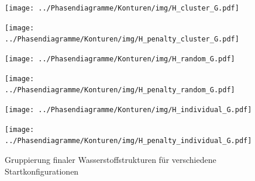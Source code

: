 \documentclass[a4paper, 10pt, twoside, openany]{book} %
\begin{document}
	\begin{figure}
		\begin{minipage}[t]{0.48\textwidth}
			\texttt{[image: ../Phasendiagramme/Konturen/img/H\_cluster\_G.pdf]}
			\label{H_cluster_G}
		\end{minipage}
		\hfill
		\begin{minipage}[t]{0.48\textwidth}
			\texttt{[image: ../Phasendiagramme/Konturen/img/H\_penalty\_cluster\_G.pdf]}
			\label{H_penalty_cluster_G}
		\end{minipage}
		\begin{minipage}[t]{0.48\textwidth}
			\texttt{[image: ../Phasendiagramme/Konturen/img/H\_random\_G.pdf]}
			\label{H_random_G}
		\end{minipage}
		\hfill
		\begin{minipage}[t]{0.48\textwidth}
			\texttt{[image: ../Phasendiagramme/Konturen/img/H\_penalty\_random\_G.pdf]}
			\label{H_penalty_random_G}
		\end{minipage}
		\begin{minipage}[t]{0.48\textwidth}
			\texttt{[image: ../Phasendiagramme/Konturen/img/H\_individual\_G.pdf]}
			\label{H_individual_G}
		\end{minipage}
		\hfill
		\begin{minipage}[t]{0.48\textwidth}
			\texttt{[image: ../Phasendiagramme/Konturen/img/H\_penalty\_individual\_G.pdf]}
			\label{H_penalty_individual_G}
		\end{minipage}
		\caption[Gruppierung finaler Wasserstoffstrukturen]{Gruppierung finaler Wasserstoffstrukturen für verschiedene Startkonfigurationen}
		\label{H_G}
	\end{figure}
	
\end{document}
